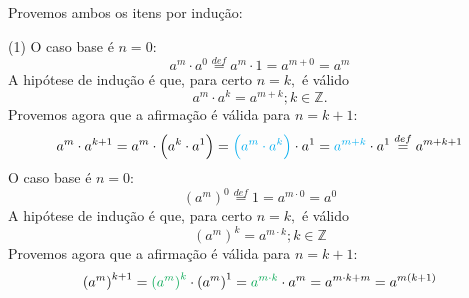 \documentclass[12pt, a4paper]{article}
\newcommand{\negrito}[1]{\mbox{\boldmath{$#1$}}}
\newcommand{\Z}{\mathbb{Z}}
\newcommand{\itens}[1]{\begin{tasks}[label={(tsk[a])},label-width=3.6ex, label-format = {\bfseries}, column-sep = {0pt}](1) #1\end{tasks}}
\newcommand{\alt}[1]{\textcolor{Floresta}{$\negrito{(#1)} $}}
\begin{document}
\begin{solution}
Provemos ambos os itens por indução:
\itens{
\task[\alt{a}] O caso base é $n = 0:$
$$a^{m}\cdot a^{0}\stackrel{def}{=}a^{m}\cdot 1=a^{m+0}=a^{m}$$
A hipótese de indução é que, para certo $n = k,$ é válido
$$a^{m}\cdot a^{k}=a^{m+k};k \in \Z.$$
Provemos agora que a afirmação é válida para $n = k +1:$
$$a^{m}\cdot a^{k+1}=a^{m}\cdot \left( a^{k}\cdot a^{1} \right) = \textcolor{Cyan}{\left( a^{m}\cdot a^{k} \right)}\cdot a^{1}=\textcolor{Cyan}{a^{m+k}}\cdot a^{1}\stackrel{def}{=}a^{m+k+1}$$
\task[\alt{b}] O caso base é $n = 0:$
$$\left( a^{m} \right) ^{0}\stackrel{def}{=}1=a^{m\cdot0}=a^{0}$$
A hipótese de indução é que, para certo $n = k,$ é válido
$$\left( a^{m} \right)^{k}=a^{m\cdot k};k \in \Z$$
Provemos agora que a afirmação é válida para $n = k +1:$
$$\left( a^{m} \right)^{k+1}= \textcolor{Green}{\left( a^{m} \right)^{k}}\cdot \left( a^{m} \right)^{1}=\textcolor{Green}{a^{m\cdot k}}\cdot a^{m}=a^{m\cdot k+m}=a^{m \left( k+1 \right)}$$
}
\end{solution}
\end{document}
